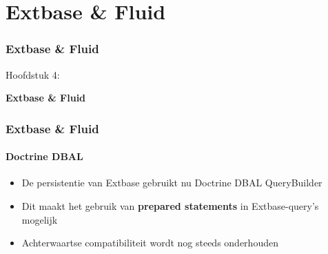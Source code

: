%

\section{Extbase \& Fluid}
\begin{frame}[fragile]
	\frametitle{Extbase \& Fluid}

	\begin{center}\huge{Hoofdstuk 4:}\end{center}
	\begin{center}\huge{\color{typo3darkgrey}\textbf{Extbase \& Fluid}}\end{center}

\end{frame}


\begin{frame}[fragile]
	\frametitle{Extbase \& Fluid}
	\framesubtitle{Doctrine DBAL}

	\begin{itemize}

		\item De persistentie van Extbase gebruikt nu Doctrine DBAL QueryBuilder
		\item Dit maakt het gebruik van \textbf{prepared statements} in Extbase-query's mogelijk
		\item Achterwaartse compatibiliteit wordt nog steeds onderhouden

	\end{itemize}

\end{frame}


